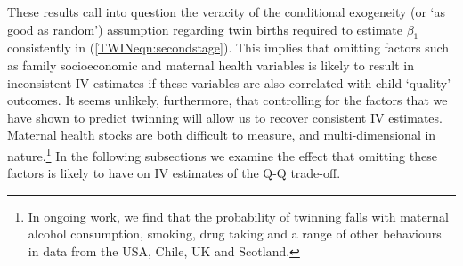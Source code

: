 These results call into question the veracity of the conditional exogeneity (or 
`as good as random') assumption regarding twin births required to estimate 
$\beta_1$ consistently in (\ref{TWINeqn:secondstage}).  This implies that omitting 
factors such as family socioeconomic and maternal health variables is likely to 
result in inconsistent IV estimates if these variables are also correlated with 
child `quality' outcomes.  It seems unlikely, furthermore, that controlling for 
the factors that we have shown to predict twinning will allow us to recover 
consistent IV estimates.  Maternal health stocks are both difficult to measure, 
and multi-dimensional in nature.\footnote{In ongoing work, we find that the 
probability of twinning falls with maternal alcohol consumption, smoking, drug 
taking and a range of other behaviours in data from the USA, Chile, UK and 
Scotland.}  In the following subsections we examine the effect that omitting these
factors is likely to have on IV estimates of the Q-Q trade-off.
